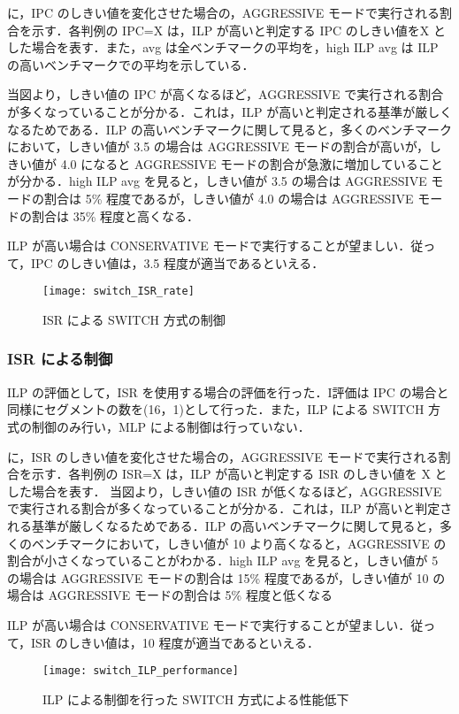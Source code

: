 に，IPC のしきい値を変化させた場合の，AGGRESSIVE モードで実行される割合を示す．各判例の IPC=X は，ILP が高いと判定する IPC のしきい値をX とした場合を表す．また，avg は全ベンチマークの平均を，high ILP avg は ILP の高いベンチマークでの平均を示している． 

当図より，しきい値の IPC が高くなるほど，AGGRESSIVE で実行される割合が多くなっていることが分かる．これは，ILP が高いと判定される基準が厳しくなるためである．ILP の高いベンチマークに関して見ると，多くのベンチマークにおいて，しきい値が 3.5 の場合は AGGRESSIVE モードの割合が高いが，しきい値が 4.0 になると AGGRESSIVE モードの割合が急激に増加していることが分かる．high ILP avg を見ると，しきい値が 3.5 の場合は AGGRESSIVE モードの割合は 5\% 程度であるが，しきい値が 4.0 の場合は AGGRESSIVE モードの割合は 35\% 程度と高くなる．

ILP が高い場合は CONSERVATIVE モードで実行することが望ましい．従って，IPC のしきい値は，3.5 程度が適当であるといえる．

\begin{figure}[htb]
  \centering
  \texttt{[image: switch\_ISR\_rate]}
  \caption{ISR による SWITCH 方式の制御}
  \label{fig:switch_ISR_rate}
\end{figure}

\subsubsection{ISR による制御}
ILP の評価として，ISR を使用する場合の評価を行った．I評価は IPC の場合と同様にセグメントの数を(16，1)として行った．また，ILP による SWITCH 方式の制御のみ行い，MLP による制御は行っていない．

に，ISR のしきい値を変化させた場合の，AGGRESSIVE モードで実行される割合を示す．各判例の ISR=X は，ILP が高いと判定する ISR のしきい値を X とした場合を表す．
当図より，しきい値の ISR が低くなるほど，AGGRESSIVE で実行される割合が多くなっていることが分かる．これは，ILP が高いと判定される基準が厳しくなるためである．ILP の高いベンチマークに関して見ると，多くのベンチマークにおいて，しきい値が 10 より高くなると，AGGRESSIVE の割合が小さくなっていることがわかる．high ILP avg を見ると，しきい値が 5 の場合は AGGRESSIVE モードの割合は 15\% 程度であるが，しきい値が 10 の場合は AGGRESSIVE モードの割合は 5\% 程度と低くなる

ILP が高い場合は CONSERVATIVE モードで実行することが望ましい．従って，ISR のしきい値は，10 程度が適当であるといえる．
\begin{figure}[htb]
  \centering
  \texttt{[image: switch\_ILP\_performance]}
  \caption{ILP による制御を行った SWITCH 方式による性能低下}
  \label{fig:switch_ILP_performance}
\end{figure}

